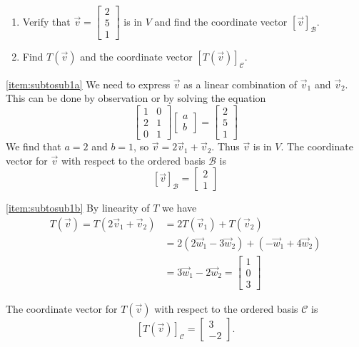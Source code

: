 \documentclass{ximera}
\begin{document}
\begin{example}
\begin{enumerate}
\item \label{item:subtosub1a}
Verify that $\vec{v}=\begin{bmatrix}2\\5\\1\end{bmatrix}$ is in $V$ and find the coordinate vector $[\vec{v}]_{\mathcal{B}}$.
\item\label{item:subtosub1b}
Find $T(\vec{v})$ and the coordinate vector $[T(\vec{v})]_{\mathcal{C}}$.
\end{enumerate}
\begin{explanation}
\ref{item:subtosub1a} We need to express $\vec{v}$ as a linear combination of $\vec{v}_1$ and $\vec{v}_2$.  This can be done by observation or by solving the equation
$$\begin{bmatrix}1&0\\2&1\\0&1\end{bmatrix}\begin{bmatrix}a\\b\end{bmatrix}=\begin{bmatrix}2\\5\\1\end{bmatrix}$$
We find that $a=2$ and $b=1$, so $\vec{v}=2\vec{v}_1+\vec{v}_2$.  Thus $\vec{v}$ is in $V$.  The coordinate vector for $\vec{v}$ with respect to the ordered basis $\mathcal{B}$ is 
$$[\vec{v}]_{\mathcal{B}}=\begin{bmatrix}2\\1\end{bmatrix}$$

\ref{item:subtosub1b} By linearity of $T$ we have \begin{align*}T(\vec{v})=T(2\vec{v}_1+\vec{v}_2)&=2T(\vec{v}_1)+T(\vec{v}_2)\\&=2(2\vec{w}_1-3\vec{w}_2)+(-\vec{w}_1+4\vec{w}_2)\\&=3\vec{w}_1-2\vec{w}_2=\begin{bmatrix}1\\0\\3\end{bmatrix}
\end{align*}

The coordinate vector for $T(\vec{v})$ with respect to the ordered basis $\mathcal{C}$ is 
$$[T(\vec{v})]_{\mathcal{C}}=\begin{bmatrix}3\\-2\end{bmatrix}.$$


\end{explanation}

\end{example}
\end{document}
